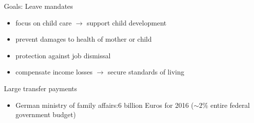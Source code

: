 \documentclass[handout]{beamer} %
\begin{document}
\begin{frame}
\begin{block}{Goals: Leave mandates}
\begin{itemize}
\item focus on child care $\rightarrow$ support child development
\item prevent damages to health of mother or child
\item protection against job dismissal
\item compensate income losses $\rightarrow$ secure standards of living
\end{itemize}
\end{block}\pause

\begin{block}{Large transfer payments}
\begin{itemize}
\item German ministry of family affairs:\newline $6$ billion Euros for 2016 ($\sim2\%$ entire federal government budget)
\end{itemize}
\end{block}

\end{frame}
\end{document}
